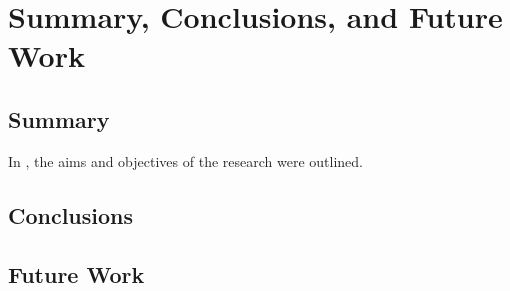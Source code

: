 \chapter{Summary, Conclusions, and Future Work}

\section{Summary}

In , the aims and objectives of the research were outlined. 

\section{Conclusions}

\section{Future Work}